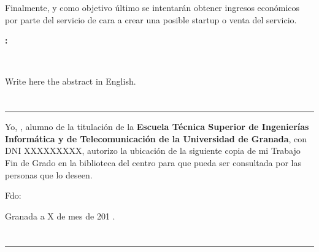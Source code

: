 Finalmente, y como objetivo último se intentarán obtener ingresos económicos por parte del servicio de cara a crear una posible startup o venta del servicio.

\cleardoublepage


\thispagestyle{empty}


\begin{center}
{\large\bfseries \myTitle: \mySubTitle}\\
\end{center}
\begin{center}
\myName\\
\end{center}

\bigskip

\vspace{0.7cm}
\bigskip

Write here the abstract in English.

\chapter*{}
\thispagestyle{empty}

\noindent\rule[-1ex]{\textwidth}{2pt}\bigskip\bigskip\bigskip

Yo, \textbf\myName, alumno de la titulación \myDegree de la \textbf{Escuela Técnica Superior
de Ingenierías Informática y de Telecomunicación de la Universidad de Granada}, con DNI XXXXXXXXX, autorizo la
ubicación de la siguiente copia de mi Trabajo Fin de Grado en la biblioteca del centro para que pueda ser
consultada por las personas que lo deseen.

\vspace{6cm}

\noindent Fdo: \myName

\vspace{2cm}

\begin{flushright}
Granada a X de mes de 201 .
\end{flushright}


\chapter*{}
\thispagestyle{empty}

\noindent\rule[-1ex]{\textwidth}{2pt}\bigskip\bigskip\bigskip

